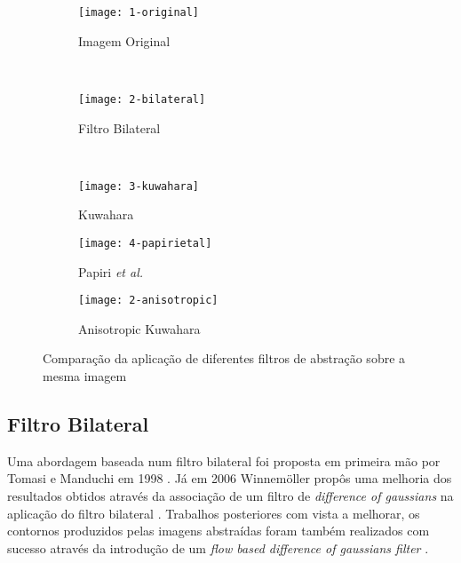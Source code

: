 \begin{figure}
        \centering
        \begin{subfigure}[b]{0.3\textwidth}
                \centering
                \texttt{[image: 1-original]}
                \caption{Imagem Original}
                \label{fig:original}
        \end{subfigure}%
        ~ %
        \begin{subfigure}[b]{0.3\textwidth}
                \centering
                \texttt{[image: 2-bilateral]}
                \caption{Filtro Bilateral}
                \label{fig:bilateral}
        \end{subfigure}
        ~ %
        \begin{subfigure}[b]{0.3\textwidth}
                \centering
                \texttt{[image: 3-kuwahara]}
                \caption{Kuwahara}
                \label{fig:kuwahara}
        \end{subfigure}
        \begin{subfigure}[b]{0.3\textwidth}
                \centering
                \texttt{[image: 4-papirietal]}
                \caption{Papiri \textit{et al.}}
                \label{fig:papiri}
        \end{subfigure}
        \begin{subfigure}[b]{0.3\textwidth}
                \centering
                \texttt{[image: 2-anisotropic]}
                \caption{Anisotropic Kuwahara}
                \label{fig:anisotropic}
        \end{subfigure}
        \caption{Comparação da aplicação de diferentes filtros de abstração sobre a mesma imagem}\label{fig:filtrosabtracao}
\end{figure}

\subsection{Filtro Bilateral}
Uma abordagem baseada num filtro bilateral foi proposta em primeira mão por Tomasi e Manduchi em 1998 \cite{Tomasi1998}. Já em 2006  Winnemöller propôs uma melhoria dos resultados obtidos através da associação de um filtro de \textit{difference of gaussians} na aplicação do filtro bilateral \cite{Winnemoller2006}. Trabalhos posteriores com vista a melhorar, os contornos produzidos pelas imagens abstraídas foram também realizados com sucesso através da introdução de um \textit{flow based difference of gaussians filter} \cite{Kang2009}.

